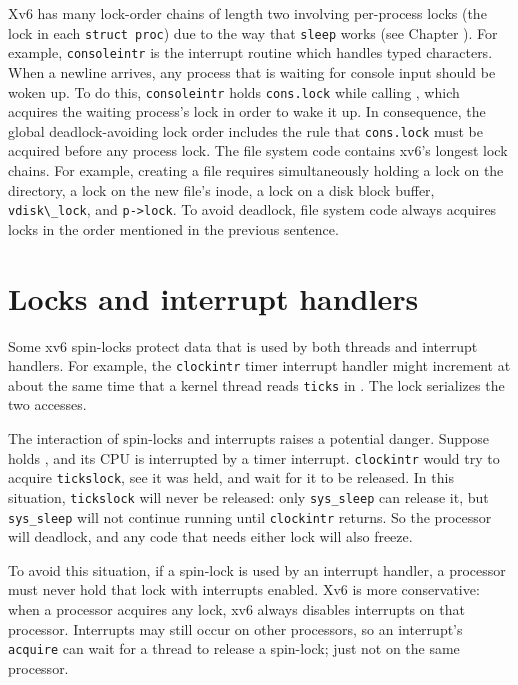Xv6 has many lock-order chains of length two involving
per-process locks
(the lock in each
\lstinline{struct proc})
due to the way that
\lstinline{sleep}
works (see Chapter
\*[CH:SCHED]).
For example,
\lstinline{consoleintr}
is the interrupt routine which handles typed characters.
When a newline arrives, any process that is waiting for
console input should be woken up.
To do this,
\lstinline{consoleintr}
holds
\lstinline{cons.lock}
while calling 
,
which acquires 
the waiting process's lock in order to wake it up.
In consequence, the global deadlock-avoiding
lock order includes the rule that
\lstinline{cons.lock}
must be acquired before any process lock.
The file system code contains xv6's longest lock chains.
For example, creating a file requires simultaneously
holding a lock on the directory, a lock on the new file's inode,
a lock on a disk block buffer, 
\lstinline{vdisk\_lock},
and
\lstinline{p->lock}.
To avoid deadlock, file system code always acquires locks in the order 
mentioned in the previous sentence.
\section{Locks and interrupt handlers}
Some xv6 spin-locks protect data that is used by
both threads and interrupt handlers.
For example, the
\lstinline{clockintr}
timer interrupt handler might increment
at about the same time that a kernel
thread reads
\lstinline{ticks} 
in
.
The lock
serializes the two accesses.

The interaction of spin-locks and interrupts raises a potential danger.
Suppose
holds
,
and its CPU is interrupted by a timer interrupt.
\lstinline{clockintr}
would try to acquire
\lstinline{tickslock},
see it was held, and wait for it to be released.
In this situation,
\lstinline{tickslock}
will never be released: only
\lstinline{sys_sleep}
can release it, but
\lstinline{sys_sleep}
will not continue running until
\lstinline{clockintr}
returns.
So the processor will deadlock, and any code
that needs either lock will also freeze.

To avoid this situation, if a spin-lock is used by an interrupt handler,
a processor must never hold that lock with interrupts enabled.
Xv6 is more conservative: when a processor acquires any
lock, xv6 always disables interrupts on that processor.
Interrupts may still occur on other processors, so 
an interrupt's
\lstinline{acquire}
can wait for a thread to release a spin-lock; just not on the same processor.

